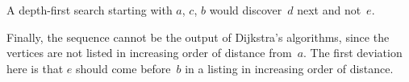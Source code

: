 \documentclass{jn-pset}
\begin{document}
\begin{problem}
\begin{solution}
\begin{compactitem}
  \item
    A depth-first search starting with $a$, $c$, $b$ would discover~$d$
    next and not~$e$.
        
  \item
    Finally, the sequence cannot be the output of Dijkstra's    algorithms,
    since the vertices are not listed in increasing order of distance
    from~$a$. The first deviation here is that $e$ should come
    before~$b$ in a listing in increasing order of distance.
    
  \end{compactitem}

  
\end{solution}

      

  
\end{problem}
\end{document}

